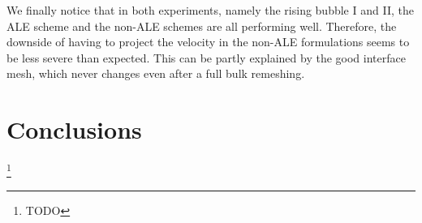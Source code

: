 \documentclass[a4paper,12pt,onecolumn]{article}
\begin{document}
We finally notice that in both experiments, namely the rising bubble I and II,
the ALE scheme and the non-ALE schemes are all performing well. Therefore, the
downside of having to project the velocity in the non-ALE formulations seems to
be less severe than expected. This can be partly explained by the good
interface mesh, which never changes even after a full bulk remeshing.

\section*{Conclusions}
\footnote{TODO}



\end{document}
